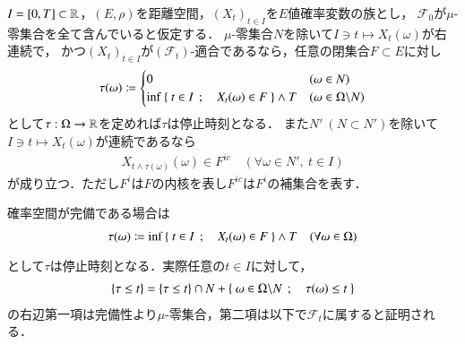 	\begin{itembox}[l]{}
		\begin{thm}[閉集合と停止時刻]
			$I = [0,T] \subset \mathbb{R}$，$(E,\rho)$を距離空間，$(X_t)_{t \in I}$を$E$値確率変数の族とし，
			$\mathcal{F}_0$が$\mu$-零集合を全て含んでいると仮定する．
			$\mu$-零集合$N$を除いて$I \ni t \longmapsto X_t(\omega)$が右連続で，
			かつ$(X_t)_{t \in I}$が$(\mathcal{F}_t)$-適合であるなら，任意の閉集合$F \subset E$に対し
			\begin{align}
				\tau(\omega) \coloneqq
				\begin{cases}
					0 & (\omega \in N) \\
					\operatorname*{inf}_{} \left\{\ t \in I\ \, ; \quad X_t(\omega) \in F\ \right\} \wedge T & (\omega \in \Omega \backslash N)
				\end{cases}
			\end{align}
			として$\tau:\Omega \rightarrow \mathbb{R}$を定めれば$\tau$は停止時刻となる．
			また$N'\ (N \subset N')$を除いて$I \ni t \longmapsto X_t(\omega)$が連続であるなら
			\begin{align}
				X_{t \wedge \tau(\omega)}(\omega) \in F^{ic} \quad (\forall \omega \in N',\ t \in I)
			\end{align}
			が成り立つ．ただし$F^i$は$F$の内核を表し$F^{ic}$は$F^i$の補集合を表す．
			\label{thm:closed_set_stopping_time}
		\end{thm}
	\end{itembox}
	確率空間が完備である場合は
	\begin{align}
		\tau(\omega) \coloneqq \operatorname*{inf}_{} \left\{\ t \in I\ \, ; \quad X_t(\omega) \in F\ \right\} \wedge T
		\quad (\forall \omega \in \Omega)
	\end{align}
	として$\tau$は停止時刻となる．実際任意の$t \in I$に対して，
	\begin{align}
		\{\tau \leq t\} = \{\tau \leq t\} \cap N + \left\{\ \omega \in \Omega \backslash N\ \, ; \quad \tau(\omega) \leq t\ \right\}
	\end{align}
	の右辺第一項は完備性より$\mu$-零集合，第二項は以下で$\mathcal{F}_t$に属すると証明される．

